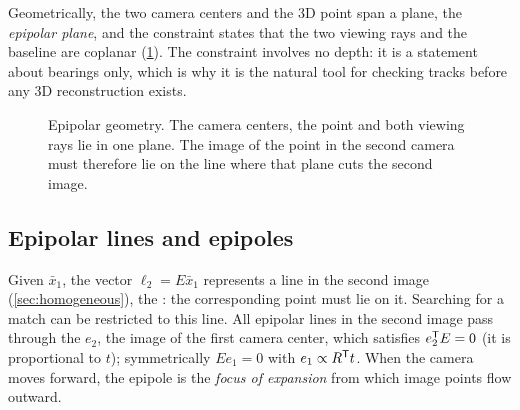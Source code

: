 Geometrically, the two camera centers and the 3D point span a plane, the \emph{epipolar plane}, and the constraint states that the two viewing rays and the baseline
are coplanar (\cref{fig:epipolar}). The constraint involves no depth: it is a statement about bearings only, which is why it is the natural tool for checking tracks
before any 3D reconstruction exists.

\begin{figure}[t]
\centering
{}
\caption{Epipolar geometry. The camera centers, the point and both viewing rays lie in one plane. The image of the point in the second camera must therefore lie on
the line where that plane cuts the second image.}
\label{fig:epipolar}
\end{figure}

\subsection{Epipolar lines and epipoles}

Given $\bar x_1$, the vector $\ell_2 = E\bar x_1$ represents a line in the second image (\cref{sec:homogeneous}), the : the corresponding point must lie on
it. Searching for a match can be restricted to this line. All epipolar lines in the second image pass through the  $e_2$, the image of the first camera
center, which satisfies $e_2^{\mathsf{T}} E = 0$ (it is proportional to $t$); symmetrically $Ee_1 = 0$ with $e_1 \propto R^{\mathsf{T}} t$. When the camera moves forward, the epipole is the
\emph{focus of expansion} from which image points flow outward.

